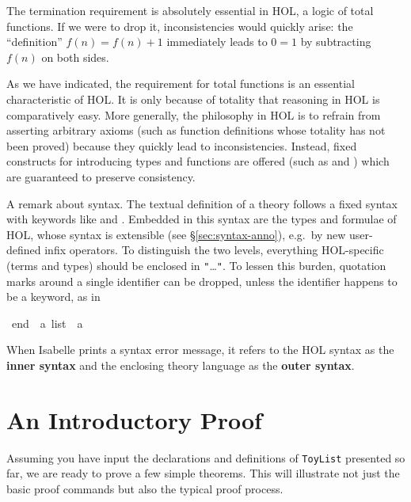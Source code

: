 \begin{isabellebody}
\begin{isamarkuptext}
The termination requirement is absolutely essential in HOL, a logic of total
functions. If we were to drop it, inconsistencies would quickly arise: the
``definition'' $f(n) = f(n)+1$ immediately leads to $0 = 1$ by subtracting
$f(n)$ on both sides.

\begin{warn}
  As we have indicated, the requirement for total functions is an essential characteristic of HOL\@. It is only
  because of totality that reasoning in HOL is comparatively easy.  More
  generally, the philosophy in HOL is to refrain from asserting arbitrary axioms (such as
  function definitions whose totality has not been proved) because they
  quickly lead to inconsistencies. Instead, fixed constructs for introducing
  types and functions are offered (such as  and
  ) which are guaranteed to preserve consistency.
\end{warn}

%
A remark about syntax.  The textual definition of a theory follows a fixed
syntax with keywords like  and .
Embedded in this syntax are the types and formulae of HOL, whose syntax is
extensible (see \S\ref{sec:syntax-anno}), e.g.\ by new user-defined infix operators.
To distinguish the two levels, everything
HOL-specific (terms and types) should be enclosed in
\texttt{"}\dots\texttt{"}. 
To lessen this burden, quotation marks around a single identifier can be
dropped, unless the identifier happens to be a keyword, as in%
\end{isamarkuptext}%
\isamarkuptrue%
\ {\isachardoublequote}end{\isachardoublequote}\ {\isacharcolon}{\isacharcolon}\ {\isachardoublequote}{\isacharprime}a\ list\ {\isasymRightarrow}\ {\isacharprime}a{\isachardoublequote}\isamarkupfalse%
%
\begin{isamarkuptext}%
\noindent
When Isabelle prints a syntax error message, it refers to the HOL syntax as
the \textbf{inner syntax} and the enclosing theory language as the \textbf{outer syntax}.


\section{An Introductory Proof}
\label{sec:intro-proof}

Assuming you have input the declarations and definitions of \texttt{ToyList}
presented so far, we are ready to prove a few simple theorems. This will
illustrate not just the basic proof commands but also the typical proof
process.


\end{isamarkuptext}
\end{isabellebody}
